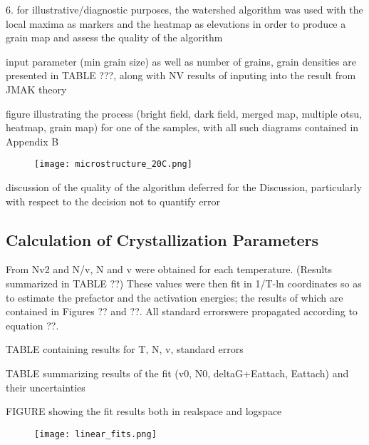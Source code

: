 6. for illustrative/diagnostic purposes, the watershed algorithm was used with the local maxima as markers and the heatmap as elevations in order to produce a grain map and assess the quality of the algorithm

input parameter (min grain size) as well as number of grains, grain densities are presented in TABLE ???, along with NV results of inputing into the result from JMAK theory

figure illustrating the process (bright field, dark field, merged map, multiple otsu, heatmap, grain map) for one of the samples, with all such diagrams contained in Appendix B

	\begin{figure}[h]
		\centering
		\texttt{[image: microstructure\_20C.png]}
		\caption{}
		\label{fig:jmak_1}
	\end{figure}

discussion of the quality of the algorithm deferred for the Discussion, particularly with respect to the decision not to quantify error

\subsection{Calculation of Crystallization Parameters}

From Nv2 and N/v, N and v were obtained for each temperature. (Results summarized in TABLE ??)
  These values were then fit in 1/T-ln coordinates so as to estimate the prefactor and the activation energies; the results of which are contained in Figures ?? and ??.  All standard errorswere propagated according to equation ??.

TABLE containing results for T, N, v, standard errors

TABLE summarizing results of the fit (v0, N0, deltaG+Eattach, Eattach) and their uncertainties

FIGURE showing the fit results both in realspace and logspace

	\begin{figure}[h]
		\centering
		\texttt{[image: linear\_fits.png]}
		\caption{}
		\label{fig:linear_fits}
	\end{figure}

